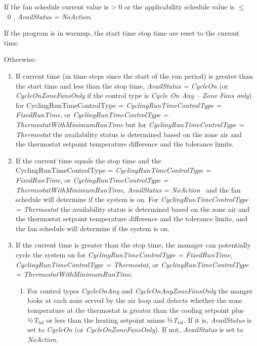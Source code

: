 If the fan schedule current value is \textgreater{} 0 or the applicability schedule value is \(\le\) ~0 , \emph{AvailStatus = NoAction}.

If the program is in warmup, the start time stop time are reset to the current time.

Otherwise:

\begin{enumerate}
\item  If current time (in time steps since the start of the run period) is greater than the start time and less than the stop time, \emph{AvailStatus = CycleOn} (or \emph{CycleOnZoneFansOnly} if the control type is \emph{Cycle On Any -- Zone Fans only}) for CyclingRunTimeControlType = \emph{CyclingRunTimeControlType = FixedRunTime}, or \emph{CyclingRunTimeControlType = ThermostatWithMinimumRunTime} but for \emph{CyclingRunTimeControlType = Thermostat} the availability status is determined based on the zone air and the thermostat setpoint temperature difference and the tolerance limits.

\item  If the current time equals the stop time and the CyclingRunTimeControlType = \emph{CyclingRunTimeControlType = FixedRunTime}, or \emph{CyclingRunTimeControlType = ThermostatWithMinimumRunTime}, \emph{AvailStatus = NoAction} ~and the fan schedule will determine if the system is on. For \emph{CyclingRunTimeControlType = Thermostat} the availability status is determined based on the zone air and the thermostat setpoint temperature difference and the tolerance limits, and the fan schedule will determine if the system is on.

\item  If the current time is greater than the stop time, the manager can potentially cycle the system on for \emph{CyclingRunTimeControlType = FixedRunTime}, \emph{CyclingRunTimeControlType = Thermostat}, or \emph{CyclingRunTimeControlType = ThermostatWithMinimumRunTime}.

  \begin{enumerate}
  \item  For control types \emph{CycleOnAny} and \emph{CycleOnAnyZoneFansOnly} the manger looks at each zone served by the air loop and detects whether the zone temperature at the thermostat is greater than the cooling setpoint plus ½\emph{T\(_{tol}\)} or less than the heating setpoint minus ½\emph{T\(_{tol}\)}. If it is, \emph{AvailStatus} is set to \emph{CycleOn} (or \emph{CycleOnZoneFansOnly}). If not, \emph{AvailStatus} is set to \emph{NoAction}.


\end{enumerate}
\end{enumerate}
